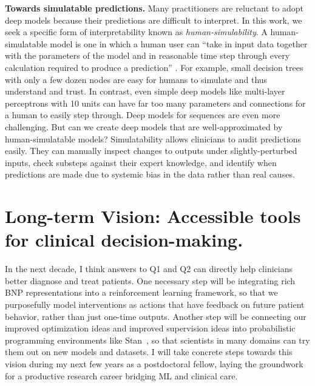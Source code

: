 \documentclass[11pt,letterpaper]{article}
\begin{document}
\textbf{Towards simulatable predictions.}
Many
practitioners are reluctant to adopt deep models because their
predictions are difficult to interpret.  In this work, we seek a
specific form of interpretability known as \emph{human-simulability}.
A human-simulatable model is one in which a human user can ``take in
input data together with the parameters of the model and in reasonable
time step through every calculation required to produce a
prediction'' \cite{lipton2016interpretability}.  For example, small
decision trees with only a few dozen nodes are easy for
humans to simulate and thus understand and trust.  In contrast, even
simple deep models like multi-layer perceptrons with 10
units can have far too many parameters and connections for a human to easily step through.  Deep models for sequences are even more
challenging.  But can we create deep models that are well-approximated
by human-simulatable models?
Simulatability allows clinicians to
audit predictions easily.  They can manually inspect changes to
outputs under slightly-perturbed inputs, check substeps against their
expert knowledge, and identify when predictions are made due to
systemic bias in the data rather than real causes.



\section{Long-term Vision: Accessible tools for clinical decision-making.}

In the next decade, I think answers to Q1 and Q2 can directly help clinicians better diagnose and treat patients.
One necessary step will be integrating rich BNP representations into a reinforcement learning framework, so that we purposefully model interventions as actions that have feedback on future patient behavior, rather than just one-time outputs.
Another step will be connecting our improved optimization ideas and improved supervision ideas into probabilistic programming environments like Stan~\citep{kucukelbir2015stan}, so that scientists in many domains can try them out on new models and datasets.
I will take concrete steps towards this vision during my next few years as a postdoctoral fellow, laying the groundwork for a productive research career bridging ML and clinical care.

{\scriptsize
\setlength{\bibsep}{1pt}

}
\end{document}
